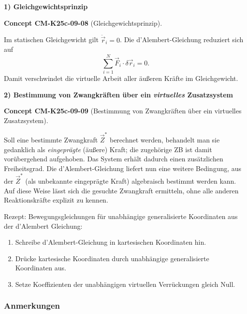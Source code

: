 \documentclass[10pt, letterpaper]{article}
\newcommand{\CustomHeading}[3]{%
  \par\medskip\noindent%
  \textbf{#1 #2} \textnormal{(#3)}.\enskip%
}
\newenvironment{CONC}[2]{\begin{unitbox}\CustomHeading{Concept}{#1}{#2}}{\end{unitbox}}
\begin{document}

\textbf{1) Gleichgewichtsprinzip}\\[-4pt]

\begin{CONC}{CM-K25c-09-08}{Gleichgewichtsprinzip}
Im statischen Gleichgewicht gilt $\ddot{\vec r}_i=0$. Die d’Alembert-Gleichung reduziert sich auf
\[
  \sum_{i=1}^{N}\vec F_i\!\cdot\!\delta\vec r_i = 0 .
\]
Damit verschwindet die virtuelle Arbeit aller äußeren Kräfte
im Gleichgewicht.
\end{CONC}



\textbf{2) Bestimmung von Zwangkräften über ein
          \emph{virtuelles} Zusatz­system}\\[-4pt]

\begin{CONC}{CM-K25c-09-09}{Bestimmung von Zwangkräften über ein virtuelles Zusatz­system}
Soll eine bestimmte Zwangkraft $\vec Z^{\ast}$ berechnet werden, behandelt man sie gedanklich als
\emph{eingeprägte} (äußere) Kraft; die zugehörige ZB ist damit vorübergehend aufgehoben. Das System erhält dadurch einen zusätzlichen Freiheitsgrad. Die d’Alembert-Gleichung liefert nun eine weitere Bedingung, aus der $\vec Z^{\ast}$ (als unbekannte eingeprägte Kraft) algebraisch bestimmt werden kann. Auf diese Weise lässt sich die gesuchte Zwangkraft ermitteln, ohne alle anderen Reaktionskräfte explizit zu kennen.
\end{CONC}



Rezept: Bewegungsgleichungen für unabhängige generalisierte Koordinaten aus der d'Alembert Gleichung:

\begin{enumerate}
\item Schreibe d'Alembert-Gleichung in kartesischen Koordinaten hin.
\item Drücke kartesische Koordinaten durch unabhängige generalisierte Koordinaten aus.
\item Setze Koeffizienten der unabhängigen virtuellen Verrückungen gleich Null.
\end{enumerate}


\subsubsection*{Anmerkungen}
\end{document}
